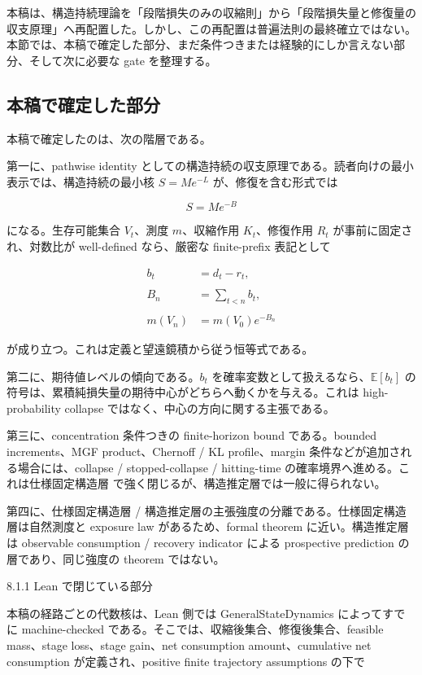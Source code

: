 \documentclass[12pt,a4paper]{article}
\begin{document}
本稿は、構造持続理論を「段階損失のみの収縮則」から「段階損失量と修復量の収支原理」へ再配置した。しかし、この再配置は普遍法則の最終確立ではない。本節では、本稿で確定した部分、まだ条件つきまたは経験的にしか言えない部分、そして次に必要な gate を整理する。

\subsection{本稿で確定した部分}\label{ux672cux7a3fux3067ux78baux5b9aux3057ux305fux90e8ux5206}

本稿で確定したのは、次の階層である。

第一に、pathwise identity としての構造持続の収支原理である。読者向けの最小表示では、構造持続の最小核 \(S=Me^{-L}\) が、修復を含む形式では

\[
S = M e^{-B}
\]

になる。生存可能集合 \(V_{t}\)、測度 \(m\)、収縮作用 \(K_{t}\)、修復作用 \(R_{t}\) が事前に固定され、対数比が well-defined なら、厳密な finite-prefix 表記として

\[
\begin{aligned}
b_{t}&=d_{t}-r_{t}, \\
\qquad \\
B_{n}&=\sum_{t<n}b_{t}, \\
\qquad \\
m(V_{n})&=m(V_0)e^{-B_{n}}
\end{aligned}
\]

が成り立つ。これは定義と望遠鏡積から従う恒等式である。

第二に、期待値レベルの傾向である。\(b_{t}\) を確率変数として扱えるなら、\(\mathbb E[b_{t}]\) の符号は、累積純損失量の期待中心がどちらへ動くかを与える。これは high-probability collapse ではなく、中心の方向に関する主張である。

第三に、concentration 条件つきの finite-horizon bound である。bounded increments、MGF product、Chernoff / KL profile、margin 条件などが追加される場合には、collapse / stopped-collapse / hitting-time の確率境界へ進める。これは仕様固定構造層 で強く閉じるが、構造推定層では一般に得られない。

第四に、仕様固定構造層 / 構造推定層の主張強度の分離である。仕様固定構造層は自然測度と exposure law があるため、formal theorem に近い。構造推定層は observable consumption / recovery indicator による prospective prediction の層であり、同じ強度の theorem ではない。

8.1.1 Lean で閉じている部分

本稿の経路ごとの代数核は、Lean 側では GeneralStateDynamics によってすでに machine-checked である。そこでは、収縮後集合、修復後集合、feasible mass、stage loss、stage gain、net consumption amount、cumulative net consumption が定義され、positive finite trajectory assumptions の下で
\end{document}
